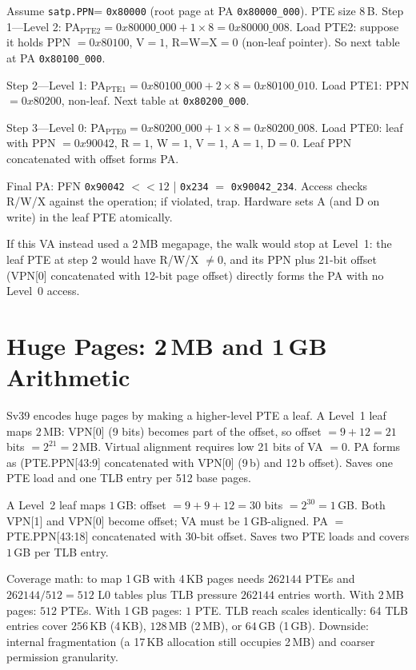 Assume \texttt{satp.PPN}= \texttt{0x80000} (root page at PA \texttt{0x80000\_000}). PTE size $8$\,B.
Step 1---Level 2: PA$_{\text{PTE2}} = 0x80000\_000 + 1\times8 = 0x80000\_008$. Load PTE2: suppose it holds PPN $=0x80100$, V$=1$, R=W=X$=0$ (non-leaf pointer). So next table at PA \texttt{0x80100\_000}.

Step 2---Level 1: PA$_{\text{PTE1}} = 0x80100\_000 + 2\times8 = 0x80100\_010$. Load PTE1: PPN $=0x80200$, non-leaf. Next table at \texttt{0x80200\_000}.

Step 3---Level 0: PA$_{\text{PTE0}} = 0x80200\_000 + 1\times8 = 0x80200\_008$. Load PTE0: leaf with PPN $=0x90042$, R$=1$, W$=1$, V$=1$, A$=1$, D$=0$. Leaf PPN concatenated with offset forms PA.

Final PA: PFN \texttt{0x90042} $<<12$ | \texttt{0x234} $=$ \texttt{0x90042\_234}. Access checks R/W/X against the operation; if violated, trap. Hardware sets A (and D on write) in the leaf PTE atomically.

If this VA instead used a 2\,MB megapage, the walk would stop at Level~1: the leaf PTE at step 2 would have R/W/X $\neq 0$, and its PPN plus 21-bit offset (VPN[0] concatenated with 12-bit page offset) directly forms the PA with no Level~0 access.
\section{Huge Pages: 2\,MB and 1\,GB Arithmetic}
Sv39 encodes huge pages by making a higher-level PTE a leaf. A Level~1 leaf maps $2$\,MB: VPN[0] (9 bits) becomes part of the offset, so offset $=9+12=21$ bits $=2^{21}=2$\,MB. Virtual alignment requires low 21 bits of VA $=0$. PA forms as (PTE.PPN[43:9] concatenated with VPN[0] (9\,b) and 12\,b offset). Saves one PTE load and one TLB entry per 512 base pages.

A Level~2 leaf maps $1$\,GB: offset $=9+9+12=30$ bits $=2^{30}=1$\,GB. Both VPN[1] and VPN[0] become offset; VA must be 1\,GB-aligned. PA $=$ PTE.PPN[43:18] concatenated with 30-bit offset. Saves two PTE loads and covers $1$\,GB per TLB entry.

Coverage math: to map 1\,GB with 4\,KB pages needs $262144$ PTEs and $262144/512=512$ L0 tables plus TLB pressure $262144$ entries worth. With 2\,MB pages: $512$ PTEs. With 1\,GB pages: $1$ PTE. TLB reach scales identically: 64 TLB entries cover $256$\,KB (4\,KB), $128$\,MB (2\,MB), or $64$\,GB (1\,GB). Downside: internal fragmentation (a 17\,KB allocation still occupies 2\,MB) and coarser permission granularity.

